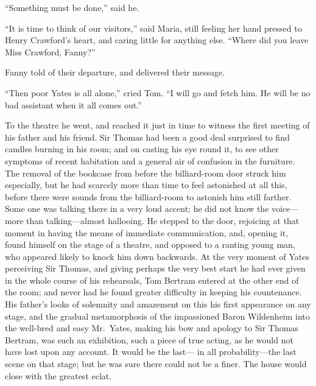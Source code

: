 ``Something must be done,'' said he.

``It is time to think of our visitors,'' said Maria,
still feeling her hand pressed to Henry Crawford's heart,
and caring little for anything else.  ``Where did you leave
Miss Crawford, Fanny?''

Fanny told of their departure, and delivered their message.

``Then poor Yates is all alone,'' cried Tom.  ``I will go
and fetch him.  He will be no bad assistant when it
all comes out.''

To the theatre he went, and reached it just in time to
witness the first meeting of his father and his friend.
Sir Thomas had been a good deal surprised to find candles
burning in his room; and on casting his eye round it,
to see other symptoms of recent habitation and a general
air of confusion in the furniture.  The removal of the
bookcase from before the billiard-room door struck
him especially, but he had scarcely more than time
to feel astonished at all this, before there were sounds
from the billiard-room to astonish him still farther.
Some one was talking there in a very loud accent; he did
not know the voice---more than talking---almost hallooing.
He stepped to the door, rejoicing at that moment in having
the means of immediate communication, and, opening it,
found himself on the stage of a theatre, and opposed
to a ranting young man, who appeared likely to knock him
down backwards.  At the very moment of Yates perceiving
Sir Thomas, and giving perhaps the very best start he
had ever given in the whole course of his rehearsals,
Tom Bertram entered at the other end of the room;
and never had he found greater difficulty in keeping
his countenance.  His father's looks of solemnity and
amazement on this his first appearance on any stage,
and the gradual metamorphosis of the impassioned Baron
Wildenheim into the well-bred and easy Mr.\ Yates,
making his bow and apology to Sir Thomas Bertram, was such
an exhibition, such a piece of true acting, as he would
not have lost upon any account.  It would be the last---%
in all probability---the last scene on that stage; but he
was sure there could not be a finer.  The house would
close with the greatest eclat.

